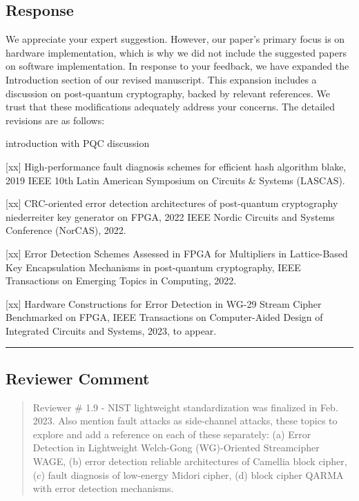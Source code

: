 \subsection{Response}

We appreciate your expert suggestion. However, our paper's primary focus is on hardware implementation, which is why we did not include the suggested papers on software implementation. In response to your feedback, we have expanded the Introduction section of our revised manuscript. This expansion includes a discussion on post-quantum cryptography, backed by relevant references. We trust that these modifications adequately address your concerns. The detailed revisions are as follows:

\color{blue}

introduction with PQC discussion


	[xx] High-performance fault diagnosis schemes for efficient hash algorithm blake, 2019 IEEE 10th Latin American Symposium on Circuits \& Systems (LASCAS).

	[xx] CRC-oriented error detection architectures of post-quantum cryptography niederreiter key generator on FPGA, 2022 IEEE Nordic Circuits and Systems Conference (NorCAS), 2022.

	[xx] Error Detection Schemes Assessed in FPGA for Multipliers in Lattice-Based Key Encapsulation Mechanisms in post-quantum cryptography, IEEE Transactions on Emerging Topics in Computing, 2022.

	[xx] Hardware Constructions for Error Detection in WG-29 Stream Cipher Benchmarked on FPGA, IEEE Transactions on Computer-Aided Design of Integrated Circuits and Systems, 2023, to appear.

\color{black}

\noindent\rule{\linewidth}{2.0pt}

\subsection{Reviewer Comment}
\begin{mdframed}
	\begin{quote}
		Reviewer \# 1.9 - NIST lightweight standardization was finalized in Feb. 2023. Also mention fault attacks as side-channel attacks, these topics to explore and add a reference on each of these separately: (a) Error Detection in Lightweight Welch-Gong (WG)-Oriented Streamcipher WAGE, (b) error detection reliable architectures of Camellia block cipher, (c) fault diagnosis of low-energy Midori cipher, (d) block cipher QARMA with error detection mechanisms.
	\end{quote}
\end{mdframed}

